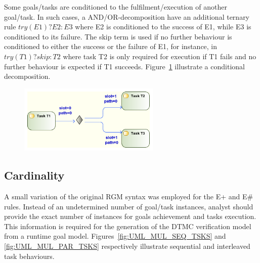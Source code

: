 Some goals/tasks are conditioned to the fulfilment/execution of another goal/task. In such cases, a AND/OR-decomposition have an additional ternary rule $try(E1)?E2:E3$ where E2 is conditioned to the success of E1, while E3 is conditioned to its failure. The skip term is used if no further behaviour is conditioned to either the success or the failure of E1, for instance, in $try(T1)?skip:T2$ where task T2 is only required for execution if T1 fails and no further behaviour is expected if T1 succeeds. Figure~\ref{fig:UML_TRY_TSKS} illustrate a conditional decomposition.

\begin{figure}[ht!]
\centering
\includegraphics[width=0.60\textwidth]{imgs/UML_TRY_TSKS.png}
\caption{}
\label{fig:UML_TRY_TSKS}
\end{figure}

\subsection{Cardinality}

A small variation of the original RGM syntax was employed for the E+ and E\# rules. Instead of an undetermined number of goal/task instances, analyst should provide the exact number of instances for goals achievement and tasks execution. This information is required for the generation of the DTMC verification model from a runtime goal model. Figures~\ref{fig:UML_MUL_SEQ_TSKS} and \ref{fig:UML_MUL_PAR_TSKS} respectively illustrate sequential and interleaved task behaviours.

